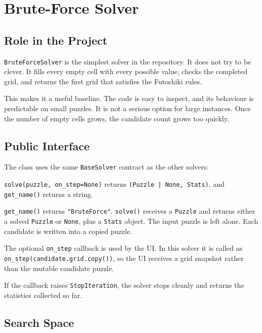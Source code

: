 
\section{Brute-Force Solver}
\label{sec:brute_force}

\subsection{Role in the Project}

\texttt{BruteForceSolver} is the simplest solver in the repository. It does
not try to be clever. It fills every empty cell with every possible value,
checks the completed grid, and returns the first grid that satisfies the
Futoshiki rules.

This makes it a useful baseline. The code is easy to inspect, and its behaviour
is predictable on small puzzles. It is not a serious option for large
instances. Once the number of empty cells grows, the candidate count grows too
quickly.

\subsection{Public Interface}

The class uses the same \texttt{BaseSolver} contract as the other solvers:

\texttt{solve(puzzle, on\_step=None)} returns
\texttt{(Puzzle | None, Stats)}, and \texttt{get\_name()} returns a string.

\texttt{get\_name()} returns \texttt{"BruteForce"}. \texttt{solve()} receives a
\texttt{Puzzle} and returns either a solved \texttt{Puzzle} or \texttt{None},
plus a \texttt{Stats} object. The input puzzle is left alone. Each candidate is
written into a copied puzzle.

The optional \texttt{on\_step} callback is used by the UI. In this solver it is
called as \texttt{on\_step(candidate.grid.copy())}, so the UI receives a grid
snapshot rather than the mutable candidate puzzle.

If the callback raises \texttt{StopIteration}, the solver stops cleanly and
returns the statistics collected so far.

\subsection{Search Space}

